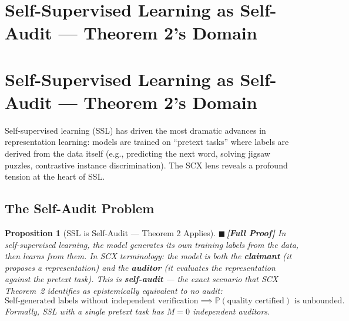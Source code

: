 \documentclass[12pt,a4paper]{article}
\newtheorem{proposition}[theorem]{Proposition}
\theoremstyle{definition}
\newcommand{\rigorFull}{{\color{rigorcolor}$\blacksquare$\,\textbf{[Full Proof]}}}
\newcommand{\SCX}{\textsc{SCX}}
\newcommand{\Pbb}{\mathbb{P}}
\begin{document}
\section{Self-Supervised Learning as Self-Audit — Theorem 2's Domain}
\section{Self-Supervised Learning as Self-Audit --- Theorem 2's Domain}
\label{sec:ssl}

Self-supervised learning (SSL) has driven the most dramatic advances in representation learning: models are trained on ``pretext tasks'' where labels are derived from the data itself (e.g., predicting the next word, solving jigsaw puzzles, contrastive instance discrimination). The \SCX{} lens reveals a profound tension at the heart of SSL.

\subsection{The Self-Audit Problem}

\begin{proposition}[SSL is Self-Audit — Theorem 2 Applies]\label{prop:ssl_selfaudit}
\rigorFull
In self-supervised learning, the model generates its own training labels from the data, then learns from them. In \SCX{} terminology: the model is both the \textbf{claimant} (it proposes a representation) and the \textbf{auditor} (it evaluates the representation against the pretext task). This is \textbf{self-audit} — the exact scenario that \SCX{} Theorem~2 identifies as epistemically equivalent to no audit:
\begin{equation}\label{eq:ssl_thm2}
    \text{Self-generated labels without independent verification} \implies \Pbb(\text{quality certified}) \text{ is unbounded.}
\end{equation}
Formally, SSL with a single pretext task has $M=0$ independent auditors.
\end{proposition}
\end{document}
